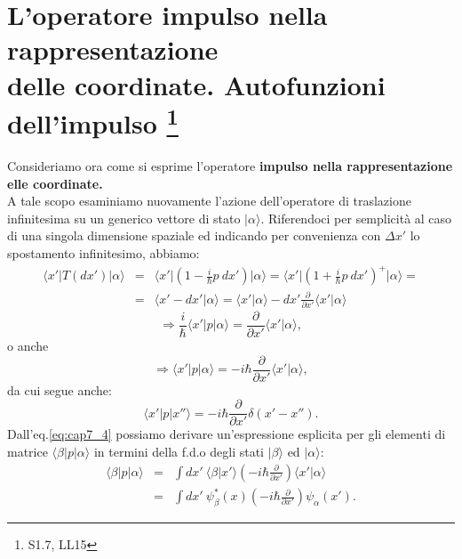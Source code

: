 \documentclass[a4paper,12pt,oneside]{book}
\begin{document}
\section[L'operatore impulso nella rappresentazione delle coordinate. Autofunzioni dell'impulso]{L'operatore impulso nella rappresentazione \\delle coordinate. Autofunzioni dell'impulso \footnote{S1.7, LL15}}
Consideriamo ora come si esprime l'operatore \textbf{impulso nella rappresentazione elle coordinate.}\\
A tale scopo esaminiamo nuovamente l'azione dell'operatore di traslazione infinitesima su un generico vettore di stato $\vert \alpha \rangle$. Riferendoci per semplicità al caso di una singola dimensione spaziale ed indicando per convenienza con $\Delta x'$ lo spostamento infinitesimo, abbiamo:
\begin{eqnarray}
\langle x' \vert T(dx') \vert \alpha \rangle 
& = & \langle x' \vert \left(1-\frac{i}{\hbar}p\ dx'\right) \vert \alpha \rangle = \langle x' \vert \left(1+\frac{i}{\hbar}p\ dx'\right) ^+ \vert \alpha \rangle = \nonumber \\
& = & \langle x'-dx'\vert \alpha \rangle = \langle x'\vert \alpha \rangle  - dx' \frac{\partial}{\partial x'} \langle x'\vert \alpha \rangle 
\end{eqnarray}
\begin{equation}
 \Rightarrow \frac{i}{\hbar}\langle x'\vert p \vert \alpha \rangle = \frac{\partial}{\partial x'}\langle x'\vert \alpha \rangle ,
\end{equation}
o anche
\begin{equation}
\label{eq:cap7_4}
\Rightarrow \langle x'\vert p \vert \alpha \rangle =-i\hbar\frac{\partial}{\partial x'}\langle x'\vert \alpha \rangle ,
\end{equation}
da cui segue anche:
\begin{equation}
\langle x'\vert p \vert x'' \rangle =-i\hbar\frac{\partial}{\partial x'}\delta (x'-x'').
\end{equation}
Dall'eq.\eqref{eq:cap7_4} possiamo derivare un'espressione esplicita per gli elementi di matrice $\langle \beta \vert p\vert \alpha \rangle $ in termini della f.d.o degli stati $\vert \beta \rangle $ ed $\vert \alpha \rangle $:
\begin{eqnarray}
\label{eq:cap7_5}
\langle \beta \vert p \vert \alpha \rangle &=& \int dx' \ \langle \beta \vert x' \rangle \left( -i\hbar \frac{\partial}{\partial x'}\right) \langle x' \vert \alpha \rangle  \nonumber \\
& = &\int dx' \ \psi _{\beta} ^* (x) \left( -i\hbar \frac{\partial}{\partial x'}\right) \psi _{\alpha}  (x') .  
\end{eqnarray}
\end{document}
